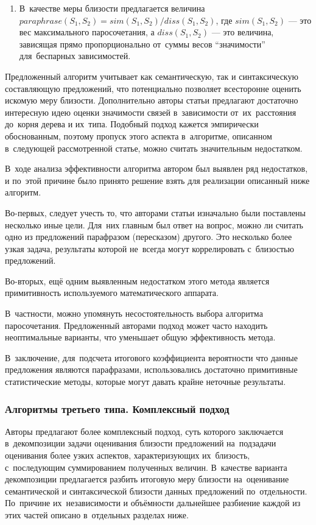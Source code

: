\begin{enumerate}
\item{
В~качестве меры близости предлагается величина 
$paraphrase(S_1, S_2) = sim(S_1,S_2)/diss(S_1, S_2)$, 
где $sim(S_1, S_2)$ --- это вес максимального паросочетания,
а $diss(S_1, S_2)$ --- это величина, зависящая прямо пропорционально  
от~суммы весов ``значимости'' для~беспарных зависимостей.
}

\end{enumerate}

Предложенный алгоритм учитывает как семантическую, так и синтаксическую составляющую предложений, 
что потенциально позволяет всесторонне оценить искомую меру близости.
Дополнительно авторы статьи предлагают достаточно интересную идею оценки значимости связей
в~зависимости от~их~расстояния до~корня дерева и их~типа.
Подобный подход кажется эмпирически обоснованным, 
поэтому пропуск этого аспекта в~алгоритме,
описанном в~следующей рассмотренной статье, можно считать значительным недостатком.

В~ходе анализа эффективности алгоритма автором был выявлен ряд недостатков,
и по~этой причине было принято решение взять для реализации описанный ниже алгоритм.

Во-первых, следует учесть то, что авторами статьи\cite{weightedDep} изначально были поставлены несколько иные цели. 
Для~них главным был ответ на вопрос, можно ли считать одно из предложений парафразом (пересказом) другого. 
Это несколько более узкая задача,
результаты которой не~всегда могут коррелировать с~близостью предложений.

Во-вторых, ещё одним выявленным недостатком этого метода является примитивность используемого математического аппарата. 

В~частности, можно упомянуть несостоятельность выбора алгоритма паросочетания. 
Предложенный авторами подход может часто находить неоптимальные варианты,
что уменьшает общую эффективность метода. 

В~заключение, для~подсчета итогового коэффициента вероятности что данные предложения
являются парафразами, использовались достаточно примитивные статистические методы,
которые могут давать крайне неточные результаты.

\subsubsection{Алгоритмы третьего типа. Комплексный подход}
\label{sec:complex_algorithm}
Авторы \cite{complexSim} предлагают более комплексный подход, 
суть которого заключается в~декомпозиции задачи
оценивания близости предложений на~подзадачи оценивания более узких аспектов, 
характеризующих их~близость, с~последующим суммированием полученных величин.
В~качестве варианта декомпозиции предлагается разбить итоговую меру близости 
на~оценивание семантической и синтаксической близости данных предложений по~отдельности.
По~причине их~независимости и объёмности дальнейшее разбиение
каждой из этих частей описано в~отдельных разделах ниже.

